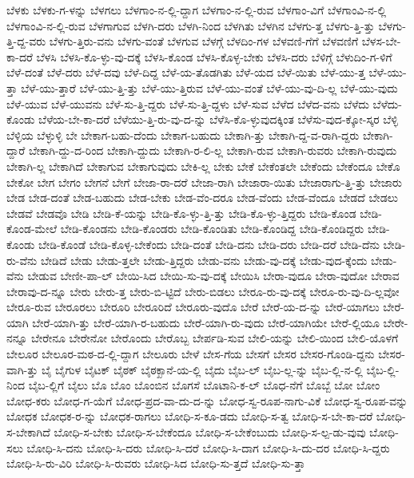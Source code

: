 {ಬೆಳಕು
ಬೆಳಕು-ಗ-ಳನ್ನು
ಬೆಳಗಲು
ಬೆಳಗಾಂ-ನ-ಲ್ಲಿ-ದ್ದಾಗ
ಬೆಳಗಾಂ-ನ-ಲ್ಲಿ-ರುವ
ಬೆಳಗಾಂ-ವಿಗೆ
ಬೆಳಗಾಂವಿ-ನ-ಲ್ಲಿ
ಬೆಳಗಾಂವಿ-ನ-ಲ್ಲಿ-ರುವ
ಬೆಳಗಾಗುವ
ಬೆಳಗಿ-ದರು
ಬೆಳಗಿ-ನಿಂದ
ಬೆಳಗಿತು
ಬೆಳಗಿನ
ಬೆಳಗು-ತ್ತ
ಬೆಳಗು-ತ್ತಿ-ತ್ತು
ಬೆಳಗು-ತ್ತಿ-ದ್ದ-ವರು
ಬೆಳಗು-ತ್ತಿರು-ವನು
ಬೆಳಗು-ವಂತೆ
ಬೆಳಗುವ
ಬೆಳಗ್ಗೆ
ಬೆಳದಿಂ-ಗಳ
ಬೆಳವಣಿ-ಗೆಗೆ
ಬೆಳವಣಿಗೆ
ಬೆಳಸ-ಬೇ-ಕಾ-ದರೆ
ಬೆಳಸಿ
ಬೆಳಸಿ-ಕೊ-ಳ್ಳು-ವು-ದಕ್ಕೆ
ಬೆಳಸಿ-ಕೊಂಡ
ಬೆಳಸಿ-ಕೊಳ್ಳ-ಬೇಕು
ಬೆಳಸಿ-ದರು
ಬೆಳಿಗ್ಗೆ
ಬೆಳುದಿಂ-ಗ-ಳಿಗೆ
ಬೆಳೆ-ದಂತೆ
ಬೆಳೆ-ದರು
ಬೆಳೆ-ದವು
ಬೆಳೆ-ದಿದ್ದ
ಬೆಳೆ-ಯ-ತೊಡಗಿತು
ಬೆಳೆ-ಯದ
ಬೆಳೆ-ಯಿತು
ಬೆಳೆ-ಯು-ತ್ತ
ಬೆಳೆ-ಯು-ತ್ತಾ
ಬೆಳೆ-ಯು-ತ್ತಾರೆ
ಬೆಳೆ-ಯು-ತ್ತಿ-ತ್ತು
ಬೆಳೆ-ಯು-ತ್ತಿರುವ
ಬೆಳೆ-ಯು-ವಂತೆ
ಬೆಳೆ-ಯು-ವು-ದಿ-ಲ್ಲ
ಬೆಳೆ-ಯು-ವುದು
ಬೆಳೆ-ಯುವ
ಬೆಳೆ-ಯುವನು
ಬೆಳೆ-ಸು-ತ್ತಿ-ದ್ದರು
ಬೆಳೆ-ಸು-ತ್ತಿ-ದ್ದಳು
ಬೆಳೆ-ಸುವ
ಬೆಳೆದ
ಬೆಳೆದ-ವನು
ಬೆಳೆದು
ಬೆಳೆದು-ಕೊಂಡು
ಬೆಳೆಯ-ಬೇ-ಕಾ-ದರೆ
ಬೆಳೆಯು-ತ್ತಿ-ರು-ವು-ದ-ನ್ನು
ಬೆಳೆಸಿ-ಕೊ-ಳ್ಳುವುದಕ್ಕಿಂತ
ಬೆಳೆಸು-ವುದ-ಕ್ಕೋ-ಸ್ಕರ
ಬೆಳ್ಳಿ
ಬೆಳ್ಳಿಯ
ಬೆಳ್ಳುಳ್ಳಿ
ಬೇ
ಬೇಕಾಗ-ಬಹು-ದೆಂದು
ಬೇಕಾಗ-ಬಹುದು
ಬೇಕಾಗಿ-ತ್ತು
ಬೇಕಾಗಿ-ದ್ದ-ವ-ರಾಗಿ-ದ್ದರು
ಬೇಕಾಗಿ-ದ್ದಾರೆ
ಬೇಕಾಗಿ-ದ್ದು-ದ-ರಿಂದ
ಬೇಕಾಗಿ-ದ್ದುದು
ಬೇಕಾಗಿ-ರ-ಲಿ-ಲ್ಲ
ಬೇಕಾಗಿ-ರುವ
ಬೇಕಾಗಿ-ರುವರು
ಬೇಕಾಗಿ-ರುವುದು
ಬೇಕಾಗಿ-ಲ್ಲ
ಬೇಕಾಗಿದೆ
ಬೇಕಾಗುವ
ಬೇಕಾಗುವುದು
ಬೇಕಿ-ಲ್ಲ
ಬೇಕು
ಬೇಕೆ
ಬೇಕೆಂತಲೇ
ಬೇಕೆಂದು
ಬೇಕೆಂದೂ
ಬೇಕೊ
ಬೇಕೋ
ಬೇಗ
ಬೇಗಂ
ಬೇಗನೆ
ಬೇಗೆ
ಬೇಜಾ-ರಾ-ದರೆ
ಬೇಜಾ-ರಾಗಿ
ಬೇಜಾರಾ-ಯಿತು
ಬೇಜಾರಾಗು-ತ್ತಿ-ತ್ತು
ಬೇಜಾರು
ಬೇಡ
ಬೇಡ-ದಂತೆ
ಬೇಡ-ಬಹುದು
ಬೇಡ-ಬೇಕು
ಬೇಡ-ವೆಂ-ದರೂ
ಬೇಡ-ವೆಂದು
ಬೇಡ-ವೆಂದೂ
ಬೇಡದೆ
ಬೇಡಲು
ಬೇಡವೆ
ಬೇಡವೊ
ಬೇಡಿ
ಬೇಡಿ-ಕೆ-ಯನ್ನು
ಬೇಡಿ-ಕೊ-ಳ್ಳು-ತ್ತಿ-ತ್ತು
ಬೇಡಿ-ಕೊ-ಳ್ಳು-ತ್ತಿದ್ದರು
ಬೇಡಿ-ಕೊಂಡ
ಬೇಡಿ-ಕೊಂಡ-ಮೇಲೆ
ಬೇಡಿ-ಕೊಂಡನು
ಬೇಡಿ-ಕೊಂಡರು
ಬೇಡಿ-ಕೊಂಡಿತು
ಬೇಡಿ-ಕೊಂಡಿದ್ದ
ಬೇಡಿ-ಕೊಂಡಿದ್ದರು
ಬೇಡಿ-ಕೊಂಡು
ಬೇಡಿ-ಕೊಂಡೆ
ಬೇಡಿ-ಕೊಳ್ಳ-ಬೇಕೆಂದು
ಬೇಡಿ-ದಂತೆ
ಬೇಡಿ-ದನು
ಬೇಡಿ-ದರು
ಬೇಡಿ-ದರೆ
ಬೇಡಿ-ದೆನು
ಬೇಡಿ-ರು-ವೆನು
ಬೇಡಿದೆ
ಬೇಡು
ಬೇಡು-ತ್ತಲೇ
ಬೇಡು-ತ್ತಿದ್ದರು
ಬೇಡು-ವನು
ಬೇಡು-ವು-ದಕ್ಕೆ
ಬೇಡು-ವುದ-ಕ್ಕೆಂದು
ಬೇಡು-ವೆನು
ಬೇಡುವ
ಬೇಣೀ-ಪಾ-ಲ್
ಬೇಯಿ-ಸಿದ
ಬೇಯಿ-ಸು-ವು-ದಕ್ಕೆ
ಬೇಯಿಸಿ
ಬೇರಾ-ವುದೂ
ಬೇರಾ-ವುದೋ
ಬೇರಾವ
ಬೇರಾವು-ದ-ನ್ನೂ
ಬೇರು
ಬೇರು-ತ್ತ
ಬೇರು-ಬಿ-ಟ್ಟಿದೆ
ಬೇರು-ಬಿಡಲು
ಬೇರೂ-ರು-ವು-ದಕ್ಕೆ
ಬೇರೂ-ರು-ವು-ದಿ-ಲ್ಲವೋ
ಬೇರೂ-ರುವ
ಬೇರೂರಲು
ಬೇರೂರಿ
ಬೇರೂರಿದೆ
ಬೇರೂರು-ವುದೊ
ಬೇರೆ
ಬೇರೆ-ಯ-ದ-ನ್ನು
ಬೇರೆ-ಯಾಗಲು
ಬೇರೆ-ಯಾಗಿ
ಬೇರೆ-ಯಾಗಿ-ತ್ತು
ಬೇರೆ-ಯಾಗಿ-ರ-ಬಹುದು
ಬೇರೆ-ಯಾಗಿ-ರು-ವುದು
ಬೇರೆ-ಯಾಗಿಯೇ
ಬೇರೆ-ಲ್ಲಿಯೂ
ಬೇರೇ-ನನ್ನೂ
ಬೇರೇನೂ
ಬೇರೇನೋ
ಬೇರೊಂದು
ಬೇರೊಬ್ಬ
ಬೇರ್ಪಡಿ-ಸುವ
ಬೇಲಿ-ಯನ್ನು
ಬೇಲಿ-ಯಿಂದ
ಬೇಲಿ-ಯೊಳಗೆ
ಬೇಲೂರ
ಬೇಲೂರ-ಮಠ-ದ-ಲ್ಲಿ-ದ್ದಾಗ
ಬೇಲೂರು
ಬೇಳೆ
ಬೇಸ-ಗೆಯ
ಬೇಸಗೆ
ಬೇಸರ
ಬೇಸರ-ಗೊಂಡಿ-ದ್ದನು
ಬೇಸರ-ವಾಗಿ-ತ್ತು
ಬೈ
ಬೈಗುಳ
ಬೈಟಕ್
ಬೈಠಕ್
ಬೈಠಕ್ಖಾನೆ-ಯ-ಲ್ಲಿ
ಬೈದು
ಬೈಬ-ಲ್
ಬೈಬ-ಲ್ಲ-ನ್ನು
ಬೈಬ-ಲ್ಲಿ-ನ-ಲ್ಲಿ
ಬೈಬ-ಲ್ಲಿ-ನಿಂದ
ಬೈಬ-ಲ್ಲಿಗೆ
ಬೈಲು
ಬೊ
ಬೊಂ
ಬೊಂಬಿನ
ಬೊಗಸೆ
ಬೊಟಾನಿ-ಕ-ಲ್
ಬೊಧ-ನೆಗೆ
ಬೊಬ್ಬೆ
ಬೋ
ಬೋಂ
ಬೋಧ-ಕರು
ಬೋಧ-ಗ-ಯೆಗೆ
ಬೋಧ-ಪ್ರದ-ವಾ-ದು-ದ-ನ್ನು
ಬೋಧ-ಸ್ವ-ರೂಪ-ನಾಗು-ವಿಕೆ
ಬೋಧ-ಸ್ವ-ರೂಪ-ವನ್ನು
ಬೋಧಕ
ಬೋಧಕ-ರ-ನ್ನು
ಬೋಧಕ-ರಾಗಲು
ಬೋಧಿ-ಸ-ಕೂ-ಡದು
ಬೋಧಿ-ಸ-ತ್ವ
ಬೋಧಿ-ಸ-ಬೇ-ಕಾ-ದರೆ
ಬೋಧಿ-ಸ-ಬೇಕಾಗಿದೆ
ಬೋಧಿ-ಸ-ಬೇಕು
ಬೋಧಿ-ಸ-ಬೇಕೆಂದೂ
ಬೋಧಿ-ಸ-ಬೇಕೆಂಬುದು
ಬೋಧಿ-ಸ-ಲ್ಪ-ಡು-ವುವು
ಬೋಧಿ-ಸಲು
ಬೋಧಿ-ಸಿ-ದನು
ಬೋಧಿ-ಸಿ-ದರು
ಬೋಧಿ-ಸಿ-ದರೆ
ಬೋಧಿ-ಸಿ-ದಾಗ
ಬೋಧಿ-ಸಿ-ದು-ದರ
ಬೋಧಿ-ಸಿ-ದ್ದರು
ಬೋಧಿ-ಸಿ-ರು-ವಿರಿ
ಬೋಧಿ-ಸಿ-ರುವರು
ಬೋಧಿ-ಸಿದ
ಬೋಧಿ-ಸು-ತ್ತದೆ
ಬೋಧಿ-ಸು-ತ್ತಾ
}
